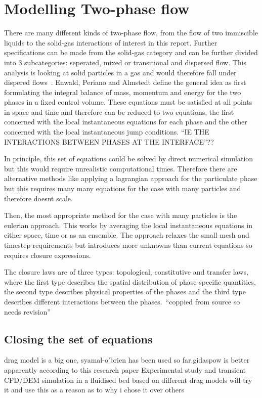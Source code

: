 \section{Modelling Two-phase flow}
There are many different kinds of two-phase flow, from the flow of two immiscible liquids to the solid-gas interactions of interest in this report. Further specifications can be made from the solid-gas category and can be further divided into 3 subcategories: seperated, mixed or transitional and dispersed flow. This analysis is looking at solid particles in a gas and would therefore fall under dispered flows~\cite{enwald1996eulerian}. Enwald, Periano and Almstedt define the general idea as first formulating the integral balance of mass, momentum and energy for the two phases in a fixed control volume. These equations must be satisfied at all points in space and time and therefore can be reduced to two equations, the first concerned with the local instantaneous equations for each phase and the other concerned with the local instantaneous jump conditions. ``IE THE INTERACTIONS BETWEEN PHASES AT THE INTERFACE''??

In principle, this set of equations could be solved by direct numerical simulation but this would require unrealistic computational times. Therefore there are alternative methods like applying a lagrangian approach for the particulate phase but this requires many many equations for the case with many particles and therefore doesnt scale.

Then, the most appropriate method for the case with many particles is the eulerian approach. This works by averaging the local instantaneous equations in either space, time or as an ensemble. The approach relaxes the small mesh and timestep requirements but introduces more unknowns than current equations so requires closure expressions.

The closure laws are of three types: topological, constitutive and transfer laws, where the first type describes the spatial distribution of phase-specific quantities, the second type describes physical properties of the phases and the third type describes different interactions between the phases.~``coppied from source so needs revision''

\subsection{Closing the set of equations}
drag model is a big one, syamal-o'brien has been used so far.gidaspow is better apparently according to this research paper Experimental study and transient CFD/DEM
simulation in a fluidised bed based on different
drag models
will try it and use this as a reason as to why i chose it over others

